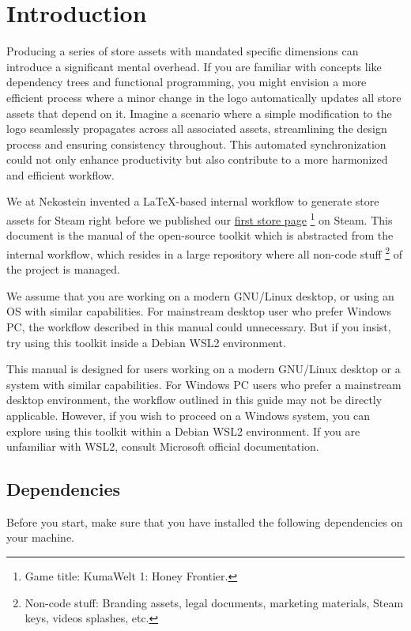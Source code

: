 \documentclass[11pt,a4paper]{report}
\providecommand{\colorhref}[2]{\textcolor{black!20!blue!80!green}{\href{#1}{#2}}}
\begin{document}
\sffamily




\chapter{Introduction}
Producing a series of store assets with mandated specific dimensions can introduce a significant mental overhead.
If you are familiar with concepts like dependency trees and functional programming,
you might envision a more efficient process where a minor change in the logo automatically updates all store assets that depend on it.
Imagine a scenario where a simple modification to the logo seamlessly propagates across all associated assets,
streamlining the design process and ensuring consistency throughout.
This automated synchronization could not only enhance productivity
but also contribute to a more harmonized and efficient workflow.


We at Nekostein invented a LaTeX-based internal workflow to generate store assets for Steam right before we published our
\colorhref{https://store.steampowered.com/app/2610000}{first store page}
\footnote{Game title: KumaWelt 1: Honey Frontier.}
on Steam.
This document is the manual of the open-source toolkit which is abstracted from the internal workflow,
which resides in a large repository where all non-code stuff
\footnote{Non-code stuff: Branding assets, legal documents, marketing materials, Steam keys, videos splashes, etc.}
of the project is managed.

We assume that you are working on a modern GNU/Linux desktop, or using an OS with similar capabilities.
For mainstream desktop user who prefer Windows PC,
the workflow described in this manual could unnecessary.
But if you insist, try using this toolkit inside a Debian WSL2 environment.

This manual is designed for users working on a modern GNU/Linux desktop or a system with similar capabilities.
For Windows PC users who prefer a mainstream desktop environment,
the workflow outlined in this guide may not be directly applicable.
However, if you wish to proceed on a Windows system,
you can explore using this toolkit within a Debian WSL2 environment.
If you are unfamiliar with WSL2,
consult Microsoft official documentation.


\section{Dependencies}
Before you start, make sure that you have installed the following dependencies on your machine.
\end{document}

